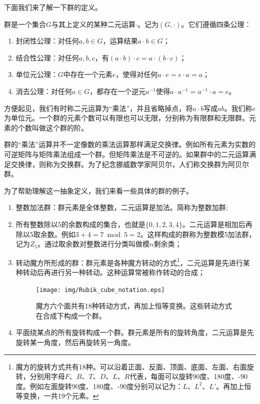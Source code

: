 \documentclass{article}
\begin{document}
下面我们来了解一下群的定义。

\begin{definition}群是一个集合$G$与其上定义的某种二元运算$\cdot$。记为$(G, \cdot)$。它们遵循四条公理：
\begin{enumerate}
\item 封闭性公理：对任何$a, b \in G$，运算结果$a \cdot b \in G$；
\item 结合性公理：对任何$a, b, c$，有$(a \cdot b) \cdot c = a \cdot (b \cdot c)$；
\item 单位元公理：$G$中存在一个元素$e$，使得对任何$a \cdot e = e \cdot a = a$；
\item 消去公理：对任何$a \in G$，都存在一个逆元$a^{-1}$使得$a \cdot a^{-1} = a^{-1} \cdot a = e$。
\end{enumerate}
\end{definition}

方便起见，我们有时称二元运算为“乘法”，并且省略掉点，将$a \cdot b$写成$ab$。我们称$e$为单位元。一个群的元素个数可以有限也可以无限，分别称为有限群和无限群。元素的个数叫做这个群的阶。

群的“乘法”运算并不一定像数的乘法运算那样满足交换律。例如所有元素为实数的可逆矩阵与矩阵乘法组成一个群。但矩阵乘法是不可逆的。如果群中的二元运算满足交换律，则称为交换群。为了纪念挪威数学家阿贝尔，人们称交换群为阿贝尔群。

为了帮助理解这一抽象定义，我们来看一些具体的群的例子。

\begin{enumerate}
\item 整数加法群：群元素是全体整数，二元运算是加法。简称为整数加群;
\item 所有整数除以5的余数构成的集合，也就是$\{0, 1, 2, 3, 4\}$。二元运算是相加后再除以5取余数。例如$3 + 4 = 7 \bmod 5 = 2$。这样构成的群称为整数模5加法群，记为$Z_5$。通过取余数对整数进行分类叫做模$n$剩余类；
\item 转动魔方所形成的群：群元素是各种魔方转动的方式\footnote{魔方的旋转方式共有18种。可以沿着正面、反面、顶面、底面、左面、右面旋转，分别用字母$F$、$B$、$T$、$D$、$L$、$R$代表，每面可以旋转90度、180度、-90度。例如左面旋转90度、180度、-90度分别可以记为：$L$、$L^2$、$L'$\cite{Wiki-Rubik-Cube-group}。再加上恒等变换，一共19个元素。}，二元运算是先进行某种转动后再进行另一种转动。这种运算常被称作转动的合成；

\begin{figure}[htbp]
 \centering
 \texttt{[image: img/Rubik\_cube\_notation.eps]}
 \caption{魔方六个面共有18种转动方式，再加上恒等变换。这些转动方式在合成下构成一个群。}
 \label{fig:Rubik-cube-notation}
\end{figure}

\item 平面绕某点的所有旋转构成一个群。群元素是所有的旋转角度，二元运算是先旋转某一角度，然后再旋转另一角度。
\end{enumerate}
\end{document}
